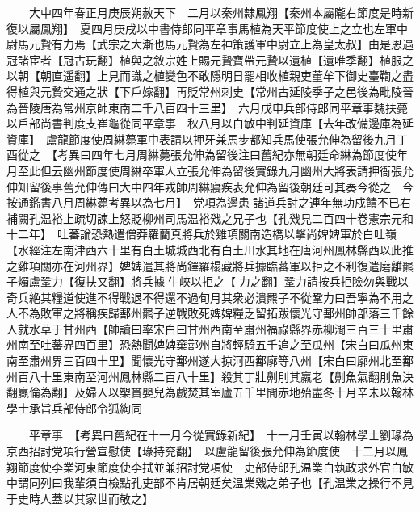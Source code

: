 　　大中四年春正月庚辰朔赦天下　二月以秦州隸鳳翔【秦州本屬隴右節度是時新復以屬鳳翔】　夏四月庚戌以中書侍郎同平章事馬植為天平節度使上之立也左軍中尉馬元贄有力焉【武宗之大漸也馬元贄為左神策護軍中尉立上為皇太叔】由是恩遇冠諸宦者【冠古玩翻】植與之敘宗姓上賜元贄寶帶元贄以遺植【遺唯季翻】植服之以朝【朝直遥翻】上見而識之植變色不敢隱明日罷相收植親吏董牟下御史臺鞫之盡得植與元贄交通之狀【下戶嫁翻】再貶常州刺史【常州古延陵季子之邑後為毗陵晉為晉陵唐為常州京師東南二千八百四十三里】　六月戊申兵部侍郎同平章事魏扶薨以戶部尚書判度支崔龜從同平章事　秋八月以白敏中判延資庫【去年改備邊庫為延資庫】　盧龍節度使周綝薨軍中表請以押牙兼馬步都知兵馬使張允伸為留後九月丁酉從之　【考異曰四年七月周綝薨張允伸為留後注曰舊紀亦無朝廷命綝為節度使年月至此但云幽州節度使周綝卒軍人立張允伸為留後實錄九月幽州大將表請押衙張允伸知留後事舊允伸傳曰大中四年戎帥周綝寢疾表允伸為留後朝廷可其奏今從之　今按通鑑書八月周綝薨考異以為七月】　党項為邊患諸道兵討之連年無功戍饋不已右補闕孔温裕上疏切諫上怒貶柳州司馬温裕戣之兄子也【孔戣見二百四十卷憲宗元和十二年】　吐蕃論恐熱遣僧莽羅藺真將兵於雞項關南造橋以擊尚婢婢軍於白吐嶺【水經注左南津西六十里有白土城城西北有白土川水其地在唐河州鳳林縣西以此推之雞項關亦在河州界】婢婢遣其將尚鐸羅榻藏將兵據臨蕃軍以拒之不利復遣磨離羆子燭盧鞏力【復扶又翻】將兵據牛峽以拒之【力之翻】鞏力請按兵拒險勿與戰以奇兵絶其糧道使進不得戰退不得還不過旬月其衆必潰羆子不從鞏力曰吾寧為不用之人不為敗軍之將稱疾歸鄯州羆子逆戰敗死婢婢糧乏留拓跋懷光守鄯州帥部落三千餘人就水草于甘州西【帥讀曰率宋白曰甘州西南至肅州福祿縣界赤柳澗三百三十里肅州南至吐蕃界四百里】恐熱聞婢婢棄鄯州自將輕騎五千追之至瓜州【宋白曰瓜州東南至肅州界三百四十里】聞懷光守鄯州遂大掠河西鄯廓等八州【宋白曰廓州北至鄯州百八十里東南至河州鳳林縣二百八十里】殺其丁壯劓刖其羸老【劓魚氣翻刖魚決翻羸倫為翻】及婦人以槊貫嬰兒為戲焚其室廬五千里間赤地殆盡冬十月辛未以翰林學士承旨兵部侍郎令狐綯同

　　平章事　【考異曰舊紀在十一月今從實錄新紀】　十一月壬寅以翰林學士劉瑑為京西招討党項行營宣慰使【瑑持兖翻】　以盧龍留後張允伸為節度使　十二月以鳳翔節度使李業河東節度使李拭並兼招討党項使　吏部侍郎孔温業白執政求外官白敏中謂同列曰我輩須自檢點孔吏部不肯居朝廷矣温業戣之弟子也【孔温業之操行不見于史時人蓋以其家世而敬之】

